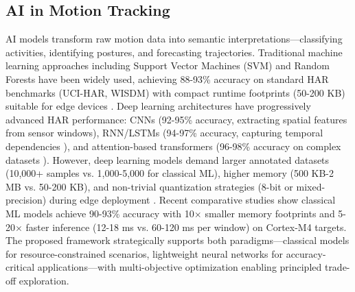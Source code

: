 \subsection{AI in Motion Tracking}
AI models transform raw motion data into semantic interpretations---classifying activities, identifying postures, and forecasting trajectories. Traditional machine learning approaches including Support Vector Machines (SVM) \cite{cortes1995svm} and Random Forests \cite{breiman2001random} have been widely used, achieving 88-93\% accuracy on standard HAR benchmarks (UCI-HAR, WISDM) with compact runtime footprints (50-200 KB) suitable for edge devices \cite{wang2024har_comparative}. Deep learning architectures have progressively advanced HAR performance: CNNs (92-95\% accuracy, extracting spatial features from sensor windows), RNN/LSTMs (94-97\% accuracy, capturing temporal dependencies \cite{xia2020lstm_har}), and attention-based transformers (96-98\% accuracy on complex datasets \cite{singh2023har_transformers}). However, deep learning models demand larger annotated datasets (10,000+ samples vs. 1,000-5,000 for classical ML), higher memory (500 KB-2 MB vs. 50-200 KB), and non-trivial quantization strategies (8-bit or mixed-precision) during edge deployment \cite{lin2022mcunet}. Recent comparative studies \cite{wang2024har_comparative} show classical ML models achieve 90-93\% accuracy with 10$\times$ smaller memory footprints and 5-20$\times$ faster inference (12-18 ms vs. 60-120 ms per window) on Cortex-M4 targets. The proposed framework strategically supports both paradigms---classical models for resource-constrained scenarios, lightweight neural networks for accuracy-critical applications---with multi-objective optimization enabling principled trade-off exploration.

